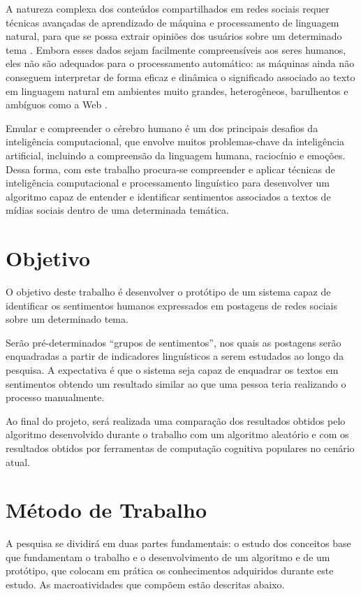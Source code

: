 \documentclass[
	12pt,				%
	openright,			%
	oneside,			%
	a4paper,			%
	english,			%
	spanish,			%
	brazil				%
	]{abntex2}
\begin{document}
	A natureza complexa dos conteúdos compartilhados em redes sociais requer técnicas avançadas de aprendizado de máquina e processamento de linguagem natural, para que se possa extrair opiniões dos usuários sobre um determinado tema \cite{article_sentiment_twitter}.
Embora esses dados sejam facilmente compreensíveis aos seres humanos, eles não são adequados para o processamento automático: as máquinas ainda não conseguem interpretar de forma eficaz e dinâmica o significado associado ao texto em linguagem natural em ambientes muito grandes, heterogêneos, barulhentos e ambíguos como a Web \cite{article_sentiment_analysis}.

	Emular e compreender o cérebro humano é um dos principais desafios da inteligência computacional, que envolve muitos problemas-chave da inteligência artificial, incluindo a compreensão da linguagem humana, raciocínio e emoções. 
Dessa forma, com este trabalho procura-se compreender e aplicar técnicas de inteligência computacional e processamento linguístico para desenvolver um algoritmo capaz de entender e identificar sentimentos associados a textos de mídias sociais dentro de uma determinada temática. 
	
	\section{Objetivo}
	O objetivo deste trabalho é desenvolver o protótipo de um sistema capaz de identificar os sentimentos humanos expressados em postagens de redes sociais sobre um determinado tema.
	
	 Serão pré-determinados “grupos de sentimentos”, nos quais as postagens serão enquadradas a partir de indicadores linguísticos a serem estudados ao longo da pesquisa. A expectativa é que o sistema seja capaz de enquadrar os textos em sentimentos obtendo um resultado similar ao que uma pessoa teria realizando o processo manualmente.
	
Ao final do projeto, será realizada uma comparação dos resultados obtidos pelo algoritmo desenvolvido durante o trabalho com um algoritmo aleatório e com os resultados obtidos por ferramentas de computação cognitiva populares no cenário atual.	
	
	\section{Método de Trabalho}
	   
	   A pesquisa se dividirá em duas partes fundamentais: o estudo dos conceitos base que fundamentam o trabalho e o desenvolvimento de um algoritmo e de um protótipo, que colocam em prática os conhecimentos adquiridos durante este estudo. As macroatividades que compõem estão descritas abaixo.
		
\end{document}
